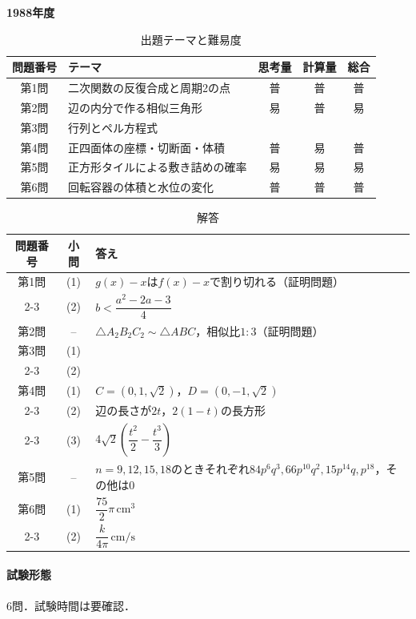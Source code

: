 \documentclass[../../main.tex]{subfiles}
\begin{document}
\begin{center}
  {\fontsize{48pt}{58pt}\selectfont \textbf{1988}\normalsize\textbf{年度}}
\end{center}

\begin{table}[htb]
  \centering
  \caption{出題テーマと難易度}
  \begin{tabular}{|c|p{6.2cm}|c|c|c|}
    \hline
    \textbf{問題番号} & \textbf{テーマ} & \textbf{思考量} & \textbf{計算量} & \textbf{総合} \\
    \hline
    第1問 & 二次関数の反復合成と周期2の点 & 普 & 普 & 普 \\
    \hline
    第2問 & 辺の内分で作る相似三角形 & 易 & 普 & 易 \\
    \hline
    第3問 & 行列とペル方程式 &  &  &  \\
    \hline
    第4問 & 正四面体の座標・切断面・体積 & 普 & 易 & 普 \\
    \hline
    第5問 & 正方形タイルによる敷き詰めの確率 & 易 & 易 & 易 \\
    \hline
    第6問 & 回転容器の体積と水位の変化 & 普 & 普 & 普 \\
    \hline
  \end{tabular}
\end{table}

\begin{table}[htb]
  \centering
  \caption{解答}
  \renewcommand{\arraystretch}{1.4}
  \begin{tabular}{|c|c|p{9cm}|}
    \hline
    \textbf{問題番号} & \textbf{小問} & \textbf{答え} \\
    \hline
    第1問 & (1) & $g(x)-x$は$f(x)-x$で割り切れる（証明問題） \\
    \cline{2-3}
    & (2) & $b<\dfrac{a^2-2a-3}{4}$ \\
    \hline
    第2問 & -- & $\triangle A_2B_2C_2\sim\triangle ABC$，相似比$1:3$（証明問題） \\
    \hline
    第3問 & (1) &  \\
    \cline{2-3}
    & (2) &  \\
    \hline
    第4問 & (1) & $C=(0,1,\sqrt{2})$，$D=(0,-1,\sqrt{2})$ \\
    \cline{2-3}
    & (2) & 辺の長さが$2t$，$2(1-t)$の長方形 \\
    \cline{2-3}
    & (3) & $4\sqrt{2}\left(\dfrac{t^2}{2}-\dfrac{t^3}{3}\right)$ \\
    \hline
    第5問 & -- & $n=9,12,15,18$のときそれぞれ$84p^6q^3,66p^{10}q^2,15p^{14}q,p^{18}$，その他は$0$ \\
    \hline
    第6問 & (1) & $\dfrac{75}{2}\pi\,\mathrm{cm}^3$ \\
    \cline{2-3}
    & (2) & $\dfrac{k}{4\pi}\,\mathrm{cm/s}$ \\
    \hline
  \end{tabular}
\end{table}

\paragraph{試験形態}
6問．試験時間は要確認．
\end{document}
